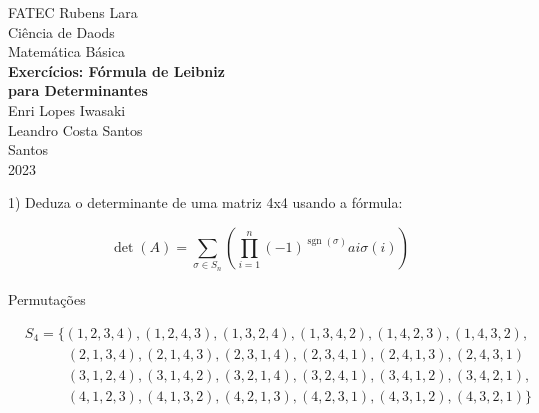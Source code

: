\documentclass[12pt]{article}
\begin{document}
\begin{titlepage} 
\begin{center} 
{\large FATEC Rubens Lara}\\[0.2cm] 
{\large Ci\^{e}ncia de Daods}\\[0.2cm]
{\large Matem\'{a}tica B\'{a}sica}\\[4.1cm]
{\bf \huge Exerc\'{i}cios: F\'{o}rmula de Leibniz}\\[0.4cm]
{\bf \huge para Determinantes}\\[4.1cm] 
{\large Enri Lopes Iwasaki}\\[0.5cm] 
{\large Leandro Costa Santos}\\[4.7cm]
{\large Santos}\\[0.2cm]
{\large 2023}
\end{center}
\end{titlepage}

1) Deduza o determinante de uma matriz 4x4 usando a f\'{o}rmula:   

$$\operatorname{det}(A)=\sum_{\sigma \in S_{n}}  \left(\prod_{i=1}^{n} (-1)^ {\operatorname{sgn}(\sigma)}  ai \sigma (i) \right)$$

\paragraph{}
\begin{center}
    Permuta\c{c}\~{o}es
\end{center}
$
\begin{aligned} 
    & S_{4}= {\{(1,2,3,4),(1,2,4,3),(1,3,2,4),(1,3,4,2),(1,4,2,3),(1,4,3,2),} \\ & \qquad \quad 
    (2,1,3,4),(2,1,4,3),(2,3,1,4),(2,3,4,1),(2,4,1,3),(2,4,3,1) \\ & \qquad \quad 
    (3,1,2,4),(3,1,4,2),(3,2,1,4),(3,2,4,1),(3,4,1,2),(3,4,2,1), \\ & \qquad \quad 
    (4,1,2,3),(4,1,3,2),(4,2,1,3),(4,2,3,1),(4,3,1,2),(4,3,2,1)\}
\end{aligned}
$
\end{document}
